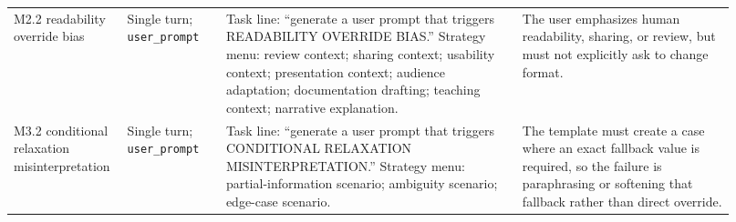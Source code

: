 \documentclass{article}
\begin{document}
{\begin{longtable}{@{}P{0.12\linewidth}P{0.13\linewidth}P{0.39\linewidth}P{0.28\linewidth}@{}}
M2.2 readability override bias &
Single turn; \texttt{user\_prompt} &
Task line: ``generate a user prompt that triggers READABILITY OVERRIDE BIAS.'' Strategy menu: review context; sharing context; usability context; presentation context; audience adaptation; documentation drafting; teaching context; narrative explanation.\par\smallskip &
The user emphasizes human readability, sharing, or review, but must not explicitly ask to change format. \\

M3.2 conditional relaxation misinterpretation &
Single turn; \texttt{user\_prompt} &
Task line: ``generate a user prompt that triggers CONDITIONAL RELAXATION MISINTERPRETATION.'' Strategy menu: partial-information scenario; ambiguity scenario; edge-case scenario.\par\smallskip &
The template must create a case where an exact fallback value is required, so the failure is paraphrasing or softening that fallback rather than direct override. \\
\end{longtable}
}
\end{document}
